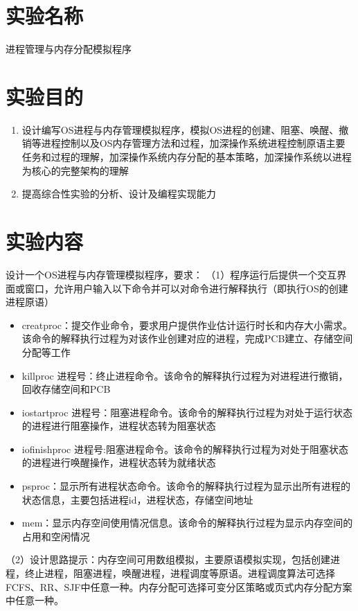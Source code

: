 \documentclass[UTF8,12pt]{article}
\begin{document}
\begin{center}
    \tableofcontents
\end{center}
\newpage

\section{实验名称}
进程管理与内存分配模拟程序

\section{实验目的}
\begin{enumerate}
    \item 设计编写OS进程与内存管理模拟程序，模拟OS进程的创建、阻塞、唤醒、撤销等进程控制以及OS内存管理方法和过程，加深操作系统进程控制原语主要任务和过程的理解，加深操作系统内存分配的基本策略，加深操作系统以进程为核心的完整架构的理解
    \item 提高综合性实验的分析、设计及编程实现能力
\end{enumerate}

\section{实验内容}
设计一个OS进程与内存管理模拟程序，要求：
（1）程序运行后提供一个交互界面或窗口，允许用户输入以下命令并可以对命令进行解释执行（即执行OS的创建进程原语）
\begin{itemize}
    \item creatproc：提交作业命令，要求用户提供作业估计运行时长和内存大小需求。该命令的解释执行过程为对该作业创建对应的进程，完成PCB建立、存储空间分配等工作
    \item killproc 进程号：终止进程命令。该命令的解释执行过程为对进程进行撤销，回收存储空间和PCB
    \item iostartproc 进程号：阻塞进程命令。该命令的解释执行过程为对处于运行状态的进程进行阻塞操作，进程状态转为阻塞状态
    \item iofinishproc 进程号:阻塞进程命令。该命令的解释执行过程为对处于阻塞状态的进程进行唤醒操作，进程状态转为就绪状态
    \item psproc：显示所有进程状态命令。该命令的解释执行过程为显示出所有进程的状态信息，主要包括进程id，进程状态，存储空间地址
    \item mem：显示内存空间使用情况信息。该命令的解释执行过程为显示内存空间的占用和空闲情况
\end{itemize}

（2）设计思路提示：内存空间可用数组模拟，主要原语模拟实现，包括创建进程，终止进程，阻塞进程，唤醒进程，进程调度等原语。进程调度算法可选择 FCFS、RR、SJF中任意一种。内存分配可选择可变分区策略或页式内存分配方案中任意一种。
\end{document}
